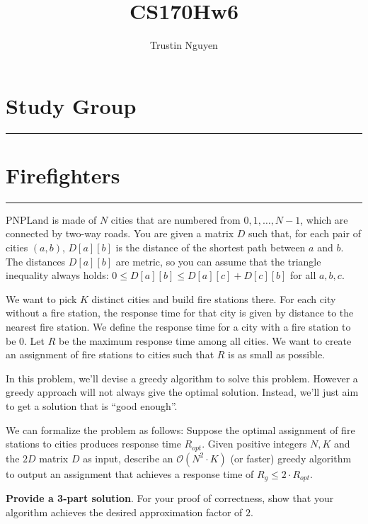 \documentclass{article}
\title{CS170Hw6}
\author{Trustin Nguyen}
\begin{document}
    \maketitle

\reversemarginpar

\section*{Study Group}
\hrule


\newpage
\section*{Firefighters}
\hrule

PNPLand is made of $N$ cities that are numbered from $0, 1, \ldots, N - 1$, which are connected by two-way roads. You are given a matrix $D$ such that, for each pair of cities $(a, b)$, $D[a][b]$ is the distance of the shortest path between $a$ and $b$. The distances $D[a][b]$ are metric, so you can assume that the triangle inequality always holds: $0 \leq D[a][b] \leq D[a][c] + D[c][b]$ for all $a, b, c$.

We want to pick $K$ distinct cities and build fire stations there. For each city without a fire station, the response time for that city is given by distance to the nearest fire station. We define the response time for a city with a fire station to be $0$. Let $R$ be the maximum response time among all cities. We want to create an assignment of fire stations to cities such that $R$ is as small as possible.

In this problem, we'll devise a greedy algorithm to solve this problem. However a greedy approach will not always give the optimal solution. Instead, we'll just aim to get a solution that is ``good enough''.

We can formalize the problem as follows: Suppose the optimal assignment of fire stations to cities produces response time $R_{opt}$. Given positive integers $N, K$ and the $2D$ matrix $D$ as input, describe an $\mathcal{O}(N^{2} \cdot K)$ (or faster) greedy algorithm to output an assignment that achieves a response time of $R_{g} \leq 2 \cdot R_{opt}$.

\textbf{Provide a 3-part solution}. For your proof of correctness, show that your algorithm achieves the desired approximation factor of $2$.
\end{document}
